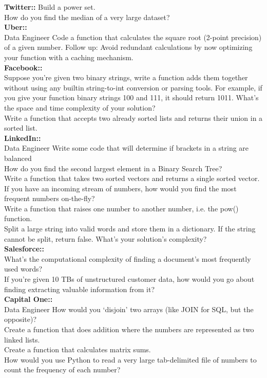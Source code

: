 \documentclass[11pt]{article}
\begin{document}
{\bf Twitter:: }
Build a power set.\\
How do you find the median of a very large dataset?\\

{\bf Uber:: }\\
Data Engineer Code a function that calculates the square root (2-point precision) of a given number. Follow up: Avoid redundant calculations by now optimizing your function with a caching mechanism. \\

{\bf Facebook:: }\\
Suppose you’re given two binary strings, write a function adds them together without using any builtin string-to-int conversion or parsing tools. For example, if you give your function binary strings 100 and 111, it should return 1011. What’s the space and time complexity of your solution? \\
Write a function that accepts two already sorted lists and returns their union in a sorted list.\\

{\bf LinkedIn:: }\\
Data Engineer Write some code that will determine if brackets in a string are balanced\\
How do you find the second largest element in a Binary Search Tree? \\
Write a function that takes two sorted vectors and returns a single sorted vector. \\
If you have an incoming stream of numbers, how would you find the most frequent numbers on-the-fly? \\
Write a function that raises one number to another number, i.e. the pow() function. \\
Split a large string into valid words and store them in a dictionary. If the string cannot be split, return false. What’s your solution’s complexity? \\

{\bf Salesforce:: }\\
What’s the computational complexity of finding a document’s most frequently used words? \\
If you’re given 10 TBs of unstructured customer data, how would you go about finding extracting valuable information from it?\\

{\bf Capital One:: }\\
Data Engineer How would you ‘disjoin’ two arrays (like JOIN for SQL, but the opposite)? \\
Create a function that does addition where the numbers are represented as two linked lists. \\
Create a function that calculates matrix sums. \\
How would you use Python to read a very large tab-delimited file of numbers to count the frequency of each number? \\
\end{document}
